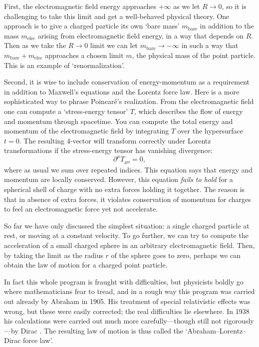 \documentclass[12pt]{article}
\newcommand{\bare}{\mathrm{bare}}
\newcommand{\elec}{\mathrm{elec}}
\begin{document}
First, the electromagnetic field energy approaches $+\infty$ as we let $R \to 0$, so it is challenging to take this limit and get a well-behaved physical theory.  One approach is to give a charged particle its own `bare mass' $m_\bare$ in addition to the mass $m_\elec$ arising from electromagnetic field energy, in a way that depends on $R$.  Then as we take the $R \to 0$ limit we can let $m_\bare \to -\infty$ in such a way that $m_\bare + m_\elec$ approaches a chosen limit $m$, the physical mass of the point particle.  This is an example of `renormalization'.

Second, it is wise to include conservation of energy-momentum as a requirement in addition to Maxwell's equations and the Lorentz force law.   Here is a more sophisticated way to phrase Poincar\'e's realization.  From the electromagnetic field one can compute a `stress-energy tensor' $T$, which describes the flow of energy and momentum through spacetime.   You can compute the total energy and momentum of the electromagnetic field by integrating $T$ over the hypersurface $t = 0$.  The resulting 4-vector will transform correctly under Lorentz transformations if the stress-energy tensor has vanishing divergence:
\[ \partial^\mu T_{\mu \nu} = 0 , \] 
where as usual we sum over repeated indices.  This equation says that energy and momentum are locally conserved.  However, this equation \emph{fails to hold} for a spherical shell of charge with no extra forces holding it together.  The reason is that in absence of extra forces, it violates conservation of momentum for charges to feel an electromagnetic force yet not accelerate.

So far we have only discussed the simplest situation: a single charged particle at rest, or moving at a constant velocity.  To go further, we can try to compute the acceleration of a small charged sphere in an arbitrary electromagnetic field.  Then, by taking the limit as the radius $r$ of the sphere goes to zero, perhaps we can obtain the law of motion for a charged point particle.   

In fact this whole program is fraught with difficulties, but physicists boldly go where
mathematicians fear to tread, and in a rough way this program was carried out already by Abraham \cite{Abraham1905} in 1905.  His treatment of special relativistic effects was wrong, but these were easily corrected; the real difficulties lie elsewhere.  In 1938 his calculations were carried out much more carefully---though still not rigorously---by Dirac \cite{Dirac}.  The resulting law of motion is thus called the `Abraham--Lorentz--Dirac force law'.
\end{document}
